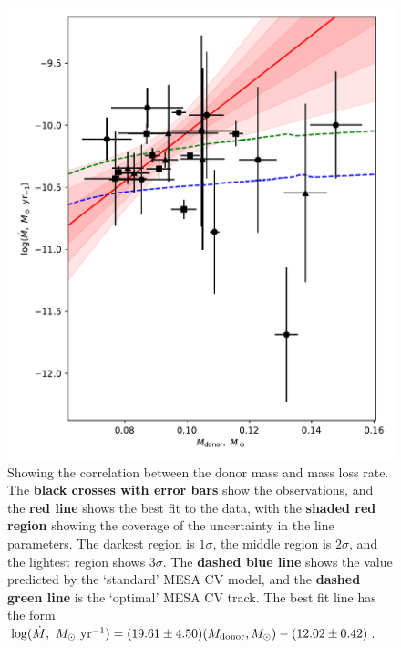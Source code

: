 \begin{figure}
    \centering
    \includegraphics[width=\textwidth]{figures/results/Mdot/Mr_Mdot.pdf}
    \caption{Showing the correlation between the donor mass and mass loss rate. The {\bf black crosses with error bars} show the observations, and the {\bf red line} shows the best fit to the data, with the {\bf shaded red region} showing the coverage of the uncertainty in the line parameters. The darkest region is $1\sigma$, the middle region is $2\sigma$, and the lightest region shows $3\sigma$. The {\bf dashed blue line} shows the value predicted by the `standard' MESA CV model, and the {\bf dashed green line} is the `optimal' MESA CV track. The best fit line has the form $\log (\dot M,\ M_\odot\ {\rm yr}^{-1}) = (19.61\pm4.50) (M_{\rm donor}, M_\odot) - (12.02\pm0.42)$. }
    \label{fig:discussion:donor mass vs Mdot fit}
\end{figure}
